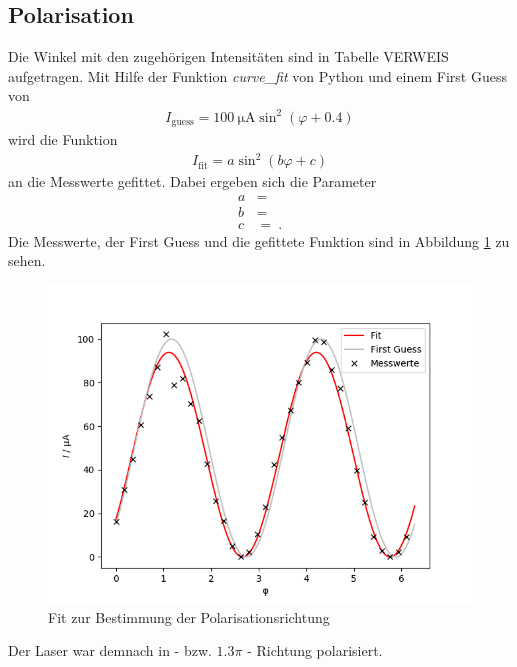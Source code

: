 \subsection{Polarisation}
Die Winkel mit den zugehörigen Intensitäten sind in Tabelle VERWEIS aufgetragen. Mit Hilfe der Funktion \textit{curve\_fit} von Python und einem First Guess von
\begin{align*}
	I_\text{guess} = \SI{100}{\micro\ampere}\sin^2(\varphi + 0.4)
\end{align*}
wird die Funktion
\begin{align*}
	I_\text{fit} = a\sin^2\left(b\varphi + c\right)
\end{align*}
an die Messwerte gefittet. Dabei ergeben sich die Parameter
\begin{align}
	a &=  \\
	b &=  \\
	c &=  \ .
\end{align}
Die Messwerte, der First Guess und die gefittete Funktion sind in Abbildung \ref{fig:fitPol} zu sehen.
\begin{figure}[h!]
	\centering
	\includegraphics[width=.6\textwidth]{Fit_Polarisation.png}
	\caption{Fit zur Bestimmung der Polarisationsrichtung}
	\label{fig:fitPol}
\end{figure}
Der Laser war demnach in - bzw. $1.3\pi$ - Richtung polarisiert.
